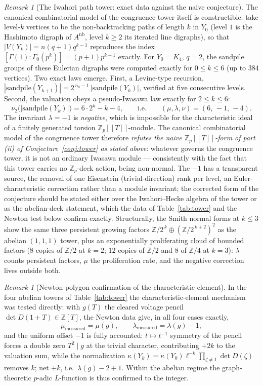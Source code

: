\documentclass[11pt]{amsart}
\numberwithin{equation}{section}
\theoremstyle{definition}
\theoremstyle{remark}
\newtheorem{remark}[theorem]{Remark}
\newcommand{\Z}{\mathbb{Z}}
\begin{document}
\begin{remark}[The Iwahori path tower: exact data against the naive conjecture]
\label{rem:iwahori}
The canonical combinatorial model of the congruence tower itself is constructible: take
level-$k$ vertices to be the non-backtracking paths of length $k$ in $Y_0$ (level $1$ is
the Hashimoto digraph of $A^{\mathrm{nb}}$, level $k\ge2$ its iterated line digraphs),
so that $|V(Y_k)|=n(q+1)q^{k-1}$ reproduces the index
$[\Gamma(1):\Gamma_0(p^k)]=(p+1)p^{k-1}$ exactly. For $Y_0=K_4$, $q=2$, the sandpile
groups of these Eulerian digraphs were computed exactly for $0\le k\le6$ (up to $384$
vertices). Two exact laws emerge. First, a Levine-type recursion,
$|\mathrm{sandpile}(Y_{k+1})|=2^{\,n_k-1}\,|\mathrm{sandpile}(Y_k)|$, verified at five
consecutive levels. Second, the valuation obeys a pseudo-Iwasawa law exactly for
$2\le k\le6$:
\[
\nu_2\bigl(|\mathrm{sandpile}(Y_k)|\bigr)=6\cdot2^k-k-4,
\qquad\text{i.e.}\qquad(\mu,\lambda,\nu)=(6,\,-1,\,-4).
\]
The invariant $\lambda=-1$ is \emph{negative}, which is impossible for the
characteristic ideal of a finitely generated torsion $\Z_p[[T]]$-module. The canonical
combinatorial model of the congruence tower therefore \emph{refutes the naive
$\Z_p[[T]]$-form of part (ii) of Conjecture~\ref{conj:tower} as stated above}: whatever
governs the congruence tower, it is not an ordinary Iwasawa module --- consistently with
the fact that this tower carries no $\Z_p$-deck action, being non-normal. The $-1$ has a
transparent source, the removal of one Eisenstein (trivial-direction) rank per level, an
Euler-characteristic correction rather than a module invariant; the corrected form of
the conjecture should be stated either over the Iwahori--Hecke algebra of the tower or
as the abelian-deck statement, which the data of Table~\ref{tab:tower} and the Newton
test below confirm exactly. Structurally, the Smith normal forms at $k\le3$ show the
same three persistent growing factors $\Z/2^{\,k}\oplus(\Z/2^{\,k+2})^2$ as the abelian
$(1,1,1)$ tower, plus an exponentially proliferating cloud of bounded factors ($8$
copies of $\Z/2$ at $k=2$; $12$ copies of $\Z/2$ and $8$ of $\Z/4$ at $k=3$): $\lambda$
counts persistent factors, $\mu$ the proliferation rate, and the negative correction
lives outside both.
\end{remark}

\begin{remark}[Newton-polygon confirmation of the characteristic element]
\label{rem:newton}
In the four abelian towers of Table~\ref{tab:tower} the characteristic-element mechanism
was tested directly: with $g(T)$ the cleared voltage pencil $\det D(1+T)\in\Z[T]$, the
Newton data give, in all four cases exactly,
\[
\mu_{\mathrm{measured}}=\mu(g),\qquad
\lambda_{\mathrm{measured}}=\lambda(g)-1 ,
\]
and the uniform offset $-1$ is fully accounted: $t\mapsto t^{-1}$ symmetry of the pencil
forces a double zero $T^2\mid g$ at the trivial character, contributing $+2k$ to the
valuation sum, while the normalization $\kappa(Y_k)=\kappa(Y_0)\ell^{-k}\prod_{\zeta\neq1}
\det D(\zeta)$ removes $k$; net $+k$, i.e.\ $\lambda(g)-2+1$. Within the abelian regime
the graph-theoretic $p$-adic $L$-function is thus confirmed to the integer.
\end{remark}
\end{document}
